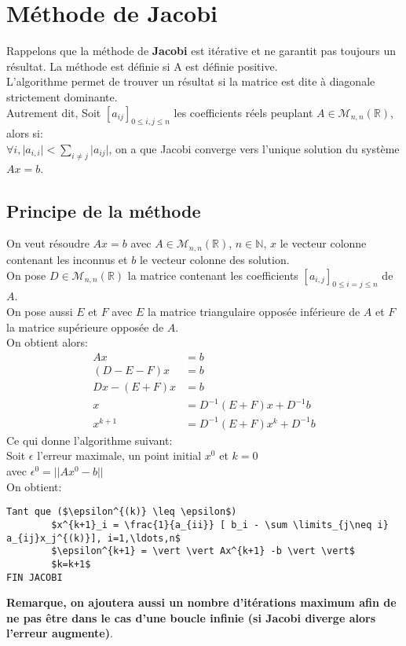 \section{Méthode de Jacobi}
Rappelons que la méthode de \textbf{Jacobi} est itérative et ne garantit pas toujours un résultat. La méthode est définie si A est définie positive.\\
L'algorithme permet de trouver un résultat si la matrice est dite à diagonale strictement dominante. \\
Autrement dit, Soit $[a_{ij}]_{0 \leq i,j \leq n}$ les coefficients réels peuplant $A \in \mathcal{M}_{n,n} (\mathbb{R})$, alors si:\\
$\forall i, \vert a_{i,i} \vert <  \sum \limits_{i \neq j} \vert a_{ij} \vert$, on a que Jacobi converge vers l'unique solution du système $Ax=b$. 
\subsection{Principe de la méthode}
On veut résoudre $Ax=b$ avec $A \in \mathcal{M}_{n,n} (\mathbb{R})$, $n \in \mathbb{N}$, $x$ le vecteur colonne contenant les inconnus et $b$ le vecteur colonne des solution. \\
On pose $D \in \mathcal{M}_{n,n}(\mathbb{R})$ la matrice contenant les coefficients $[a_{i,j}]_{0 \leq i=j \leq n}$ de $A$. \\
On pose aussi $E$ et $F$ avec $E$ la matrice triangulaire opposée inférieure de $A$ et $F$ la matrice supérieure opposée de $A$.  \\
On obtient alors:
\begin{align}
Ax &=b \\
(D-E-F)x &= b \\
Dx -(E+F)x &= b \\
x &=D^{-1}(E+F)x+D^{-1}b \\
x^{k+1} &=D^{-1}(E+F)x^{k}+D^{-1}b 
\end{align}
Ce qui donne l'algorithme suivant: \\
Soit $\epsilon$ l'erreur maximale, un point initial $x^0$ et $k=0$ \\
avec $\epsilon^{0} = \vert \vert A x^0 -b \vert \vert$ \\
On obtient: 
\begin{lstlisting}[mathescape=true, frame=single]
Tant que ($\epsilon^{(k)} \leq \epsilon$)
        $x^{k+1}_i = \frac{1}{a_{ii}} [ b_i - \sum \limits_{j\neq i} a_{ij}x_j^{(k)}], i=1,\ldots,n$
        $\epsilon^{k+1} = \vert \vert Ax^{k+1} -b \vert \vert$
        $k=k+1$
FIN JACOBI
\end{lstlisting}
\textbf{Remarque, on ajoutera aussi un nombre d'itérations maximum afin de ne pas être dans le cas d'une boucle infinie (si Jacobi diverge alors l'erreur augmente)}.
\newpage
